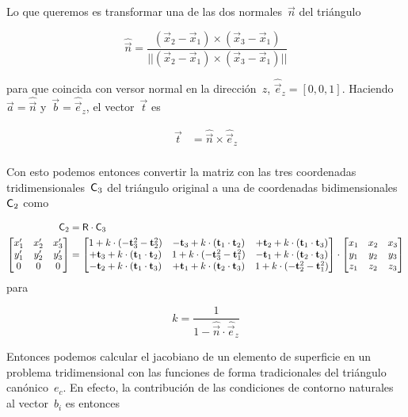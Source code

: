 \documentclass[
  12pt,
  a4paper,
  table]{scrbook}
\theoremstyle{plain}
\theoremstyle{definition}
\theoremstyle{plain}
\theoremstyle{plain}
\theoremstyle{remark}
\begin{document}
Lo que queremos es transformar una de las dos normales~\(\hat{\vec{n}}\)
del triángulo

\[
\hat{\vec{n}} = \frac{(\vec{x}_2 - \vec{x}_1) \times (\vec{x}_3 - \vec{x}_1)}{|| (\vec{x}_2 - \vec{x}_1) \times (\vec{x}_3 - \vec{x}_1) ||}
\]

para que coincida con versor normal en la dirección~\(z\),
\(\hat{\vec{e}}_z = [0,0,1]\). Haciendo~\(\vec{a} = \hat{\vec{n}}\)
y~\(\vec{b} = \hat{\vec{e}}_z\), el vector~\(\vec{t}\) es

\[
\begin{aligned}
\vec{t} &= \hat{\vec{n}} \times \hat{\vec{e}}_z \\
\end{aligned}
\]

Con esto podemos entonces convertir la matriz con las tres coordenadas
tridimensionales~\(\mathsf{C}_{3}\) del triángulo original a una de
coordenadas bidimensionales~\(\mathsf{C}_2\) como

\[
\begin{aligned}
\mathsf{C}_2 &= \mathsf{R} \cdot \mathsf{C}_3 \\
\begin{bmatrix}
x_1^\prime & x_2^\prime & x_3^\prime \\
y_1^\prime & y_2^\prime & y_3^\prime \\
0 & 0 & 0 \\
\end{bmatrix}
&=
\begin{bmatrix}
 1     + k \cdot (-\mathbf{t}_3^2- \mathbf{t}_2^2) &
 -\mathbf{t}_3 + k \cdot (\mathbf{t}_1\cdot \mathbf{t}_2) &
 +\mathbf{t}_2 + k \cdot (\mathbf{t}_1\cdot \mathbf{t}_3) \\
 +\mathbf{t}_3 + k \cdot (\mathbf{t}_1\cdot \mathbf{t}_2) &
 1     + k \cdot (-\mathbf{t}_3^2 - \mathbf{t}_1^2) &
 -\mathbf{t}_1 + k \cdot (\mathbf{t}_2\cdot \mathbf{t}_3) \\
 -\mathbf{t}_2 + k \cdot (\mathbf{t}_1\cdot \mathbf{t}_3) &
 +\mathbf{t}_1 + k \cdot (\mathbf{t}_2\cdot \mathbf{t}_3) &
 1     + k \cdot (-\mathbf{t}_2^2 - \mathbf{t}_1^2)
\end{bmatrix}
\cdot
\begin{bmatrix}
x_1 & x_2 & x_3 \\
y_1 & y_2 & y_3 \\
z_1 & z_2 & z_3
\end{bmatrix}
\end{aligned}
\] para

\[
k = \frac{1}{1- \hat{\vec{n}} \cdot \hat{\vec{e}}_z}
\]

Entonces podemos calcular el jacobiano de un elemento de superficie en
un problema tridimensional con las funciones de forma tradicionales del
triángulo canónico~\(e_c\). En efecto, la contribución de las
condiciones de contorno naturales al vector~\(b_i\) es entonces
\end{document}
